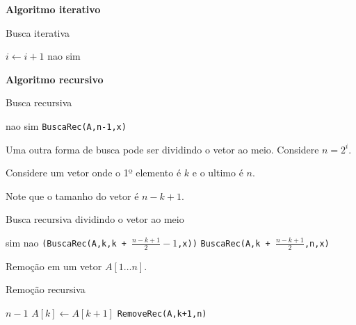 \documentclass[a4paper]{memoir}
\newcommand{\un}{1 \ldots n}
\begin{document}
\begin{sol}
\textbf{Algoritmo iterativo}

\begin{algorithm}
\caption*{Busca iterativa}
\begin{algorithmic}[1]
    \State $i \gets i + 1$
      \State \Return nao
    \Else
      \State \Return sim
    \EndIf
  \EndWhile
\EndFunction
\end{algorithmic}
\end{algorithm}

\textbf{Algoritmo recursivo}

\begin{algorithm}
\caption*{Busca recursiva}
\begin{algorithmic}[1]
    \State \Return nao
    \Else
	\State \Return sim
      \Else
	\State \Return \texttt{BuscaRec(A,n-1,x)}
      \EndIf
  \EndIf
\EndFunction
\end{algorithmic}
\end{algorithm}

Uma outra forma de busca pode ser dividindo o vetor ao meio. Considere $n = 2^i$.

Considere um vetor onde o 1º elemento é $k$ e o ultimo é $n$.

Note que o tamanho do vetor é $n - k + 1$.

\newpage 

\begin{algorithm}
\caption*{Busca recursiva dividindo o vetor ao meio}
\begin{algorithmic}[1]
    \Else
	\State \Return sim
      \Else
	\State \Return nao
      \EndIf
    \State \Return \texttt{(BuscaRec(A,k,k + $\frac{n-k+1}{2} - 1$,x))}
    \State \texttt{BuscaRec(A,k + $\frac{n-k+1}{2}$,n,x)}
  \EndIf
\EndFunction
\end{algorithmic}
\end{algorithm}

\end{sol}

\begin{ex}
Remoção em um vetor $A[\un]$.
\end{ex}

\begin{sol}

\begin{algorithm}
\caption*{Remoção recursiva}
\begin{algorithmic}[1]
    \State \Return $n-1$
  \Else
    \State $A[k] \gets A[k+1]$
  \EndIf
  \State \Return \texttt{RemoveRec(A,k+1,n)}
\EndFunction
\end{algorithmic}
\end{algorithm}

\end{sol}
\end{document}
